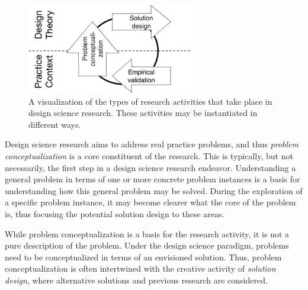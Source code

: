 \documentclass[graybox]{svmult}
\newcommand{\peggy}[1]{\textcolor{blue}{{\it [Peggy says: #1]}}}
\newcommand{\peggy}[1]{}
\begin{document}
\begin{figure}[t]
\centering
 \includegraphics[width=0.65\textwidth]{Figures/DSSE_process.pdf}
\caption{A visualization of the types of research activities that take place in design science research. These activities may be instantiated in different ways.}
\label{fig:DS_process}       %
\end{figure}


Design science research aims to address real practice problems, and thus \emph{problem conceptualization} is a core constituent of the research. %
This is typically, but not necessarily, the first step in a design science research endeavor. Understanding a general problem in terms of one or more concrete problem instances is a basis for understanding how this general problem may be solved. During the exploration of a specific problem instance, it may become clearer what the core of the problem is, thus focusing the potential solution design to these areas. 

While problem conceptualization is a basis for the research activity, it is not a pure description of the problem. Under the design science paradigm, problems need to be conceptualized in terms of an envisioned solution. Thus, problem conceptualization is often intertwined with the creative activity of \emph{solution design}, where alternative solutions and previous research are considered. 
\end{document}
